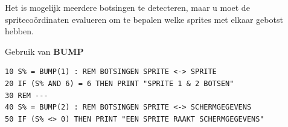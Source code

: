 \begin{description}[leftmargin=2cm,style=nextline]
\item [Opmerkingen:]  Het is mogelijk meerdere botsingen te detecteren, maar u moet de spritecoördinaten evalueren om te bepalen welke sprites met elkaar gebotst hebben.

\item [Voorbeeld:]  Gebruik van {\bf BUMP}

\begin{tcolorbox}[colback=black,coltext=white]
\verbatimfont{\codefont}
\begin{verbatim}
10 S% = BUMP(1) : REM BOTSINGEN SPRITE <-> SPRITE
20 IF (S% AND 6) = 6 THEN PRINT "SPRITE 1 & 2 BOTSEN"
30 REM ---
40 S% = BUMP(2) : REM BOTSINGEN SPRITE <-> SCHERMGEGEVENS
50 IF (S% <> 0) THEN PRINT "EEN SPRITE RAAKT SCHERMGEGEVENS"
\end{verbatim}
\end{tcolorbox}
\end{description}


\newpage
